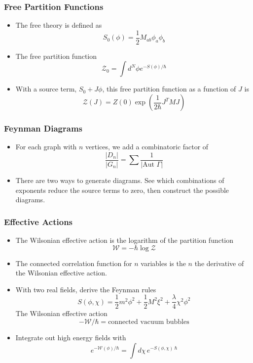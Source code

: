 \documentclass[11pt, oneside]{article}   	%
\theoremstyle{slanted}
\begin{document}
\subsubsection{Free Partition Functions}
\begin{itemize}
\item The free theory is defined as 
\[
S_0\left( \phi  \right)   = \frac{1}{2 } M _{ ab } \phi _ a \phi _b 
\] 
\item The free partition function 
\[
\mathcal{ Z } _ 0  = \int d ^N \phi e^{  - S \left( \phi  \right)  
/ \hbar } 
\] 
\item With a source term, $ S_ 0 + J \phi $, this free partition 
function as a function of $ J $ is 
\[
\mathcal{ Z } \left(  J  \right)   = 
Z\left( 0  \right)  \exp ( \frac{1}{2\hbar  } J ^ T 
M J ) 
\] 
\end{itemize}


\subsubsection{Feynman Diagrams}
\begin{itemize}
\item For each graph with $ n $ vertices, we add a combinatoric factor of 
\[
\frac{| D _ n |  }{ | G _ n  | }  = \sum \frac{1}{ | \text{Aut } \Gamma | }
\]
\item There are two ways to generate diagrams. 
See which combinations of exponents 
reduce the source terms to zero, 
then construct the possible diagrams. 
\end{itemize}

\subsubsection{Effective Actions}
\begin{itemize}
\item The Wilsonian effective action 
is the logarithm of the partition 
function 
\[
\mathcal{ W } =  - \hbar \log \mathcal{ Z } 
\]
\item The connected correlation function for $ n $ 
variables is the $ n $ the derivative 
of the Wilsonian effective action. 
\item With two real 
fields, derive the Feynman rules 
\[
S\left( \phi , \chi  \right)   = \frac{1}{2 } m ^2  \phi ^ 2 
+ \frac{1}{2 } M ^ 2 \xi ^ 2  + \frac{\lambda}{4 } 
\chi ^ 2 \phi ^ 2 
\] The Wilsonian effective action 
\[
- \mathcal{ W }  / \hbar = \text{connected vacuum bubbles} 
\] 
\item Integrate out high energy fields with 
\[
e ^{  - \mathcal{ W } \left( \phi  \right)   / \hbar } 
= \int d \chi \, e ^{  - S \left( \phi , \chi  \right)   \ \hbar } 
\] 
\end{itemize}
\end{document}

